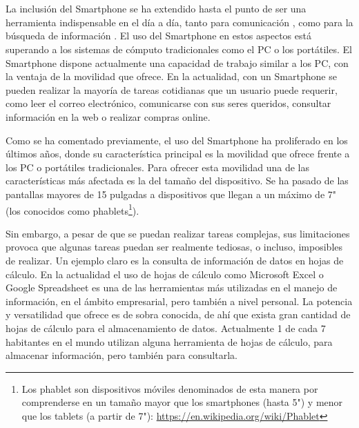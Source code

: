\chapter{\introduction}


La inclusión del Smartphone se ha extendido hasta el punto de ser una herramienta indispensable en el día a día, tanto para comunicación \cite{Montag2015}, como para la búsqueda de información \cite{Wang2016}. El uso del Smartphone en estos aspectos está superando a los sistemas de cómputo tradicionales como el PC o los portátiles. El Smartphone dispone actualmente una capacidad de trabajo similar a los PC, con la ventaja de la movilidad que ofrece. En la actualidad, con un Smartphone se pueden realizar la mayoría de tareas cotidianas que un usuario puede requerir, como leer el correo electrónico, comunicarse con sus seres queridos, consultar información en la web o realizar compras online.

Como se ha comentado previamente, el uso del Smartphone ha proliferado en los últimos años, donde su característica principal es la movilidad que ofrece frente a los PC o portátiles tradicionales. Para ofrecer esta movilidad una de las características más afectada es la del tamaño del dispositivo. Se ha pasado de las pantallas mayores de 15 pulgadas a dispositivos que llegan a un máximo de 7"  (los conocidos como phablets\footnote{Los phablet son dispositivos móviles denominados de esta manera por comprenderse en un tamaño mayor que los smartphones (hasta 5") y menor que los tablets (a partir de 7"): \url{https://en.wikipedia.org/wiki/Phablet}}).


Sin embargo, a pesar de que se puedan realizar tareas complejas, sus limitaciones provoca que algunas tareas puedan ser realmente tediosas, o incluso, imposibles de realizar. Un ejemplo claro es la consulta de información de datos en hojas de cálculo. En la actualidad el uso de hojas de cálculo como Microsoft Excel o Google Spreadsheet es una de las herramientas más utilizadas en el manejo de información, en el ámbito empresarial, pero también a nivel personal. La potencia y versatilidad que ofrece es de sobra conocida, de ahí que exista gran cantidad de hojas de cálculo para el almacenamiento de datos. Actualmente 1 de cada 7 habitantes en el mundo utilizan alguna herramienta de hojas de cálculo, para almacenar información, pero también para consultarla. %

